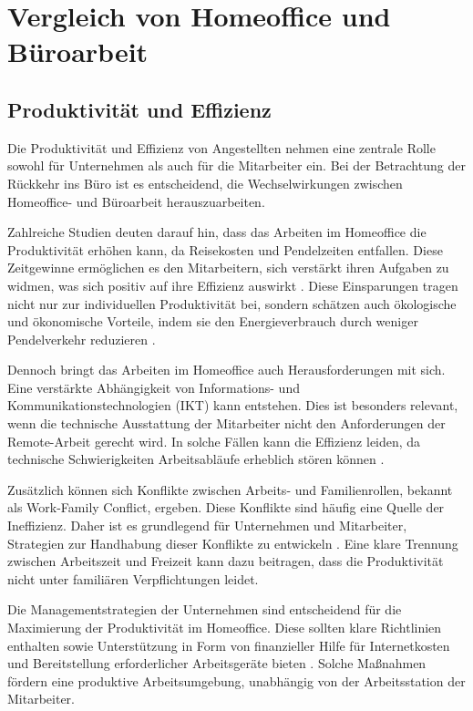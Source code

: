 \section{Vergleich von Homeoffice und Büroarbeit}

\subsection{Produktivität und Effizienz}  
Die Produktivität und Effizienz von Angestellten nehmen eine zentrale Rolle sowohl für Unternehmen als auch für die Mitarbeiter ein. Bei der Betrachtung der Rückkehr ins Büro ist es entscheidend, die Wechselwirkungen zwischen Homeoffice- und Büroarbeit herauszuarbeiten. 

Zahlreiche Studien deuten darauf hin, dass das Arbeiten im Homeoffice die Produktivität erhöhen kann, da Reisekosten und Pendelzeiten entfallen. Diese Zeitgewinne ermöglichen es den Mitarbeitern, sich verstärkt ihren Aufgaben zu widmen, was sich positiv auf ihre Effizienz auswirkt \cite{file2}. Diese Einsparungen tragen nicht nur zur individuellen Produktivität bei, sondern schätzen auch ökologische und ökonomische Vorteile, indem sie den Energieverbrauch durch weniger Pendelverkehr reduzieren \cite{file2}.

Dennoch bringt das Arbeiten im Homeoffice auch Herausforderungen mit sich. Eine verstärkte Abhängigkeit von Informations- und Kommunikationstechnologien (IKT) kann entstehen. Dies ist besonders relevant, wenn die technische Ausstattung der Mitarbeiter nicht den Anforderungen der Remote-Arbeit gerecht wird. In solche Fällen kann die Effizienz leiden, da technische Schwierigkeiten Arbeitsabläufe erheblich stören können \cite{file2}. 

Zusätzlich können sich Konflikte zwischen Arbeits- und Familienrollen, bekannt als Work-Family Conflict, ergeben. Diese Konflikte sind häufig eine Quelle der Ineffizienz. Daher ist es grundlegend für Unternehmen und Mitarbeiter, Strategien zur Handhabung dieser Konflikte zu entwickeln \cite{file2}. Eine klare Trennung zwischen Arbeitszeit und Freizeit kann dazu beitragen, dass die Produktivität nicht unter familiären Verpflichtungen leidet.

Die Managementstrategien der Unternehmen sind entscheidend für die Maximierung der Produktivität im Homeoffice. Diese sollten klare Richtlinien enthalten sowie Unterstützung in Form von finanzieller Hilfe für Internetkosten und Bereitstellung erforderlicher Arbeitsgeräte bieten \cite{file2}. Solche Maßnahmen fördern eine produktive Arbeitsumgebung, unabhängig von der Arbeitsstation der Mitarbeiter.


